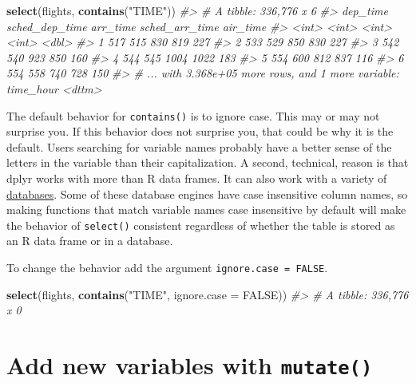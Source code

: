 \documentclass[]{book}
\newenvironment{Shaded}{\begin{snugshade}}{\end{snugshade}}
\newcommand{\CommentTok}[1]{\textcolor[rgb]{0.56,0.35,0.01}{\textit{#1}}}
\newcommand{\DataTypeTok}[1]{\textcolor[rgb]{0.13,0.29,0.53}{#1}}
\newcommand{\KeywordTok}[1]{\textcolor[rgb]{0.13,0.29,0.53}{\textbf{#1}}}
\newcommand{\NormalTok}[1]{#1}
\newcommand{\OtherTok}[1]{\textcolor[rgb]{0.56,0.35,0.01}{#1}}
\newcommand{\StringTok}[1]{\textcolor[rgb]{0.31,0.60,0.02}{#1}}
\theoremstyle{plain}
\theoremstyle{remark}
\begin{document}
\begin{Shaded}
\begin{Highlighting}[]
\KeywordTok{select}\NormalTok{(flights, }\KeywordTok{contains}\NormalTok{(}\StringTok{"TIME"}\NormalTok{))}
\CommentTok{#> # A tibble: 336,776 x 6}
\CommentTok{#>   dep_time sched_dep_time arr_time sched_arr_time air_time}
\CommentTok{#>      <int>          <int>    <int>          <int>    <dbl>}
\CommentTok{#> 1      517            515      830            819      227}
\CommentTok{#> 2      533            529      850            830      227}
\CommentTok{#> 3      542            540      923            850      160}
\CommentTok{#> 4      544            545     1004           1022      183}
\CommentTok{#> 5      554            600      812            837      116}
\CommentTok{#> 6      554            558      740            728      150}
\CommentTok{#> # ... with 3.368e+05 more rows, and 1 more variable: time_hour <dttm>}
\end{Highlighting}
\end{Shaded}

The default behavior for \texttt{contains()} is to ignore case.
This may or may not surprise you.
If this behavior does not surprise you, that could be why it is the default.
Users searching for variable names probably have a better sense of the letters
in the variable than their capitalization.
A second, technical, reason is that dplyr works with more than R data frames.
It can also work with a variety of \href{https://db.rstudio.com/dplyr/}{databases}.
Some of these database engines have case insensitive column names, so making functions that match variable names
case insensitive by default will make the behavior of
\texttt{select()} consistent regardless of whether the table is
stored as an R data frame or in a database.

To change the behavior add the argument \texttt{ignore.case\ =\ FALSE}.

\begin{Shaded}
\begin{Highlighting}[]
\KeywordTok{select}\NormalTok{(flights, }\KeywordTok{contains}\NormalTok{(}\StringTok{"TIME"}\NormalTok{, }\DataTypeTok{ignore.case =} \OtherTok{FALSE}\NormalTok{))}
\CommentTok{#> # A tibble: 336,776 x 0}
\end{Highlighting}
\end{Shaded}

\hypertarget{add-new-variables-with-mutate}{%
\section{\texorpdfstring{Add new variables with \texttt{mutate()}}{Add new variables with mutate()}}\label{add-new-variables-with-mutate}}
\end{document}
